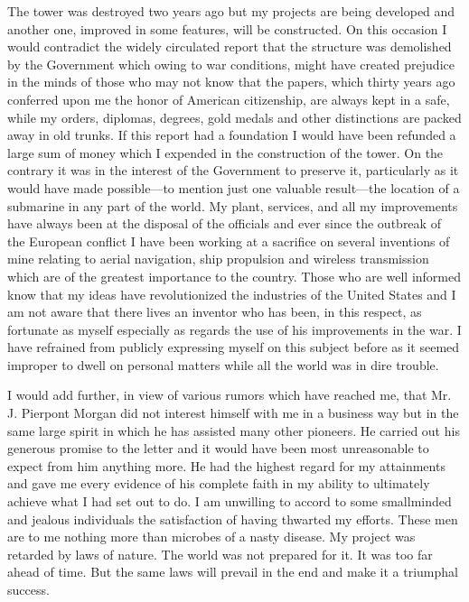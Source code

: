 \documentclass[a4paper,12pt,english,twoside,openright]{memoir}
\begin{document}
The tower was destroyed two years ago but my projects are being developed and another one, 
improved in some features, will be constructed.  On this occasion I would contradict the widely 
circulated report that the structure was demolished by the Government which owing to war 
conditions, might have created prejudice in the minds of those who may not know that the papers, 
which thirty years ago conferred upon me the honor of American citizenship, are always kept in a 
safe, while my orders, diplomas, degrees, gold medals and other distinctions are packed away in 
old trunks.  If this report had a foundation I would have been refunded a large sum of money 
which I expended in the construction of the tower.  On the contrary it was in the interest of the 
Government to preserve it, particularly as it would have made possible—to mention just one 
valuable result—the location of a submarine in any part of the world.  My plant, services, and all 
my improvements have always been at the disposal of the officials and ever since the outbreak of 
the European conflict I have been working at a sacrifice on several inventions of mine relating to 
aerial navigation, ship propulsion and wireless transmission which are of the greatest importance 
to the country.  Those who are well informed know that my ideas have revolutionized the 
industries of the United States and I am not aware that there lives an inventor who has been, in 
this respect, as fortunate as myself especially as regards the use of his improvements in the war.  
I have refrained from publicly expressing myself on this subject before as it seemed improper to 
dwell on personal matters while all the world was in dire trouble.  

I would add further, in view of various rumors which have reached me, that Mr.  J. Pierpont 
Morgan did not interest himself with me in a business way but in the same large spirit in which he 
has assisted many other pioneers.  He carried out his generous promise to the letter and it would 
have been most unreasonable to expect from him anything more.  He had the highest regard for 
my attainments and gave me every evidence of his complete faith in my ability to ultimately 
achieve what I had set out to do.  I am unwilling to accord to some smallminded and jealous 
individuals the satisfaction of having thwarted my efforts.  These men are to me nothing more 
than microbes of a nasty disease.  My project was retarded by laws of nature.  The world was not 
prepared for it.  It was too far ahead of time.  But the same laws will prevail in the end and make it 
a triumphal success.  
\end{document}
